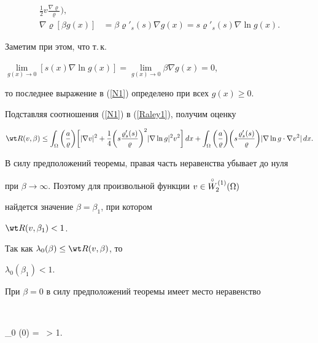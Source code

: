 \begin{pf}
\begin{equation}
\begin{split}
\frac{1}{2}v \frac{\nabla \varrho}{\varrho}\bigg),\\


\nabla \varrho [ \beta g(x) ] &= \beta \varrho'_s (s) \nabla g(x) 


= s \varrho'_s (s) \nabla \ln g(x).


\end{split}


\end{equation}


Заметим при этом, что т.\,к. 


$\lim\limits_{g(x)\rightarrow 0} [ s(x) \nabla \ln g(x) ] =


\lim\limits_{g(x)\rightarrow 0} \beta \nabla g(x) =0$,


то последнее выражение в (\ref{N1}) определено при всех $g(x) \ge 0$.





Подставляя соотношения (\ref{N1}) в (\ref{Raley1}), получим оценку


$$


\wt R(v,\beta ) \le \int_\Omega \bigg(\frac{a}{\varrho}\bigg) 


\bigg[ | \nabla v |^2 +


\frac{1}{4} \bigg( s \frac{ \varrho'_s (s) }{ \varrho} \bigg) ^2


| \nabla \ln g |^2 v^2


\bigg] \, dx +


\int_\Omega \bigg(\frac{a}{\varrho}\bigg)\bigg(


s \frac{ \varrho'_s (s) }{ \varrho} \bigg)


| \nabla \ln g \cdot \nabla v^2 |\, dx.


$$


В силу предположений теоремы, правая часть неравенства убывает до нуля


при $\beta \rightarrow \infty$. Поэтому для произвольной функции $v \in \overset{\circ}{W}\!{}_2^{\;(1)}(\Omega)$


найдется значение $\beta=\beta_1$, при котором


$\wt R(v, \beta_1) < 1$.


Так как $\lambda_0 (\beta) \le \wt R(v, \beta) $, то


$\lambda_0 (\beta_1) <1$.


При $\beta=0$ в силу предположений теоремы имеет место неравенство


$$


\lambda_0 (0) =  \,  > 1.



\end{pf}
